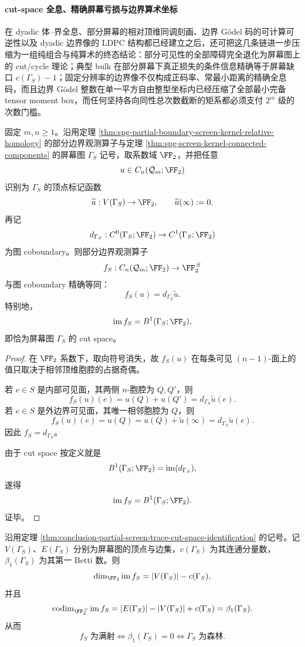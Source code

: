 \paragraph{cut-space 全息、精确屏幕亏损与边界算术坐标}
在 dyadic 体--界全息、部分屏幕的相对顶维同调刻画、边界 Gödel 码的可计算可逆性以及 dyadic 边界像的 LDPC 结构都已经建立之后，还可把这几条链进一步压缩为一组纯组合与纯算术的终态结论：部分可见性的全部障碍完全退化为屏幕图上的 cut/cycle 理论；典型 bulk 在部分屏幕下真正损失的条件信息精确等于屏幕缺口 \(c(\Gamma_S)-1\)；固定分辨率的边界像不仅构成正码率、常最小距离的精确全息码，而且边界 Gödel 整数在单一平方自由整型坐标内已经压缩了全部最小完备 tensor moment box，而任何坚持各向同性总次数截断的矩系都必须支付 \(2^m\) 级的次数门槛。

\begin{theorem}\label{thm:conclusion-partial-screen-trace-cut-space-identification}
固定 \(m,n\ge 1\)。沿用定理 \ref{thm:spg-partial-boundary-screen-kernel-relative-homology} 的部分边界观测算子与定理 \ref{thm:spg-screen-kernel-connected-components} 的屏幕图 \(\Gamma_S\) 记号，取系数域 \(\FF_2\)，并把任意
\[
u\in C_n(\mathcal Q_m;\FF_2)
\]
识别为 \(\Gamma_S\) 的顶点标记函数
\[
\widetilde u:V(\Gamma_S)\to \FF_2,
\qquad
\widetilde u(\infty):=0.
\]
再记
\[
d_{\Gamma_S}:C^0(\Gamma_S;\FF_2)\to C^1(\Gamma_S;\FF_2)
\]
为图 coboundary。则部分边界观测算子
\[
f_S:C_n(\mathcal Q_m;\FF_2)\to \FF_2^{\,S}
\]
与图 coboundary 精确等同：
\[
f_S(u)=d_{\Gamma_S}\widetilde u.
\]
特别地，
\[
\operatorname{im}f_S=B^1(\Gamma_S;\FF_2),
\]
即恰为屏幕图 \(\Gamma_S\) 的 cut space。
\end{theorem}

\begin{proof}
在 \(\FF_2\) 系数下，取向符号消失，故 \(f_S(u)\) 在每条可见 \((n-1)\)-面上的值只取决于相邻顶维胞腔的占据奇偶。

若 \(e\in S\) 是内部可见面，其两侧 \(n\)-胞腔为 \(Q,Q'\)，则
\[
f_S(u)(e)=u(Q)+u(Q')=d_{\Gamma_S}\widetilde u(e).
\]
若 \(e\in S\) 是外边界可见面，其唯一相邻胞腔为 \(Q\)，则
\[
f_S(u)(e)=u(Q)=u(Q)+\widetilde u(\infty)=d_{\Gamma_S}\widetilde u(e).
\]
因此 \(f_S=d_{\Gamma_S}\)。

由于 cut space 按定义就是
\[
B^1(\Gamma_S;\FF_2)=\operatorname{im}(d_{\Gamma_S}),
\]
遂得
\[
\operatorname{im}f_S=B^1(\Gamma_S;\FF_2).
\]
证毕。
\end{proof}

\begin{corollary}\label{cor:conclusion-screen-realizability-cycle-space-obstruction}
沿用定理 \ref{thm:conclusion-partial-screen-trace-cut-space-identification} 的记号。记 \(V(\Gamma_S)\)、\(E(\Gamma_S)\) 分别为屏幕图的顶点与边集，\(c(\Gamma_S)\) 为其连通分量数，\(\beta_1(\Gamma_S)\) 为其第一 Betti 数。则
\[
\dim_{\FF_2}\operatorname{im}f_S=|V(\Gamma_S)|-c(\Gamma_S),
\]
并且
\[
\operatorname{codim}_{\FF_2^{\,S}}\operatorname{im}f_S
=
|E(\Gamma_S)|-|V(\Gamma_S)|+c(\Gamma_S)
=
\beta_1(\Gamma_S).
\]
从而
\[
f_S\text{ 为满射}
\iff
\beta_1(\Gamma_S)=0
\iff
\Gamma_S\text{ 为森林}.
\]
\end{corollary}

